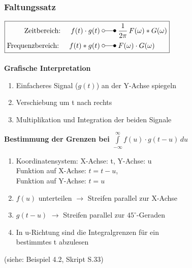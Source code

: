 	\subsubsection{Faltungssatz }
		\begin{minipage}{.45\textwidth}
				\begin{math}
				\boxed{
					\begin{aligned}
						\text{Zeitbereich: \quad} f(t)\cdot g(t) \; &\laplace \; \frac{1}{2\pi} \, F(\omega) \ast G(\omega) \\
						\text{Frequenzbereich: \quad} f(t) \ast g(t) \; &\laplace \; F(\omega) \cdot G(\omega) \\
					\end{aligned}
				}
				\end{math}\\
				\\
	
		\textbf{Grafische Interpretation}
		\begin{enumerate}
			\item Einfacheres Signal ($g(t)$) an der Y-Achse spiegeln
			\item Verschiebung um t nach rechts
			\item Multiplikation und Integration der beiden Signale
		\end{enumerate}
	\end{minipage}%
	\hspace{.1\textwidth}
	\begin{minipage}{.45\textwidth}
		\textbf{Bestimmung der Grenzen bei $\int\limits_{-\infty}^\infty f(u) \cdot g(t-u)\,du$}
		\begin{enumerate}
		  \item Koordinatensystem: X-Achse: t, Y-Achse: u\\ 
		  Funktion auf X-Achse: $t = t - u$, \\
		  Funktion auf Y-Achse: $t = u$
		  \item $f(u)$ unterteilen $\rightarrow$ Streifen parallel zur X-Achse
		  \item $g(t-u)$ $\rightarrow$ Streifen parallel zur $45^{\circ}$-Geraden
		  \item In u-Richtung sind die Integralgrenzen für ein \\ bestimmtes t abzulesen
		\end{enumerate}
		(siehe: Beispiel 4.2, Skript S.33)
	\end{minipage}
	
	

